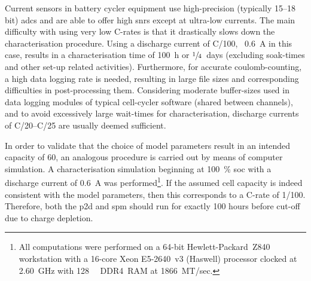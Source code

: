 Current sensors in battery cycler equipment use high-precision (typically 15--18
bit) \glspl{adc}  and are  able to  offer high  \glspl{snr} except  at ultra-low
currents. The main difficulty with using very low C-rates is that it drastically
slows  down  the  characterisation  procedure.  Using  a  discharge  current  of
C/100,  \ie~\SI{0.6}{\ampere}  in  this  case,  results  in  a  characterisation
time  of  \SI{100}{\hour}   or  \mbox{$\sfrac{1}{4}$}~days  (excluding
soak-times  and  other set-up  related  activities).  Furthermore, for  accurate
coulomb-counting, a  high data logging rate  is needed, resulting in  large file
sizes  and  corresponding  difficulties  in  post-processing  them.  Considering
moderate  buffer-sizes  used in  data  logging  modules of  typical  cell-cycler
software (shared  between channels), and  to avoid excessively  large wait-times
for  characterisation,  discharge  currents  of C/20--C/25  are  usually  deemed
sufficient.

In    order   to    validate    that   the    choice    of   model    parameters
result   in   an   intended   capacity  of   \SI{60}{\amphour},   an   analogous
procedure   is    carried   out   by    means   of   computer    simulation.   A
characterisation  simulation  beginning  at  \SI{100}{\percent}  \gls{soc}  with
a   discharge   current    of   \SI{0.6}{\ampere}   was   performed\footnote{All
computations  were  performed  on   a  64-bit  Hewlett-Packard~Z840  workstation
with   a   \mbox{16-core}   \mbox{\textsuperscript{\textregistered}}
\mbox{Xeon\textsuperscript{\textregistered}}     \mbox{E5-2640~v3}     (Haswell)
processor clocked  at \SI{2.60}{\giga\hertz} with  \SI{128}{\giga\byte} DDR4~RAM
at 1866~MT/sec.}.  If the assumed  cell capacity  is indeed consistent  with the
model parameters,  then this corresponds to  a C-rate of 1/100.  Therefore, both
the \gls{p2d} and \gls{spm} should run  for exactly 100 hours before cut-off due
to charge depletion.



